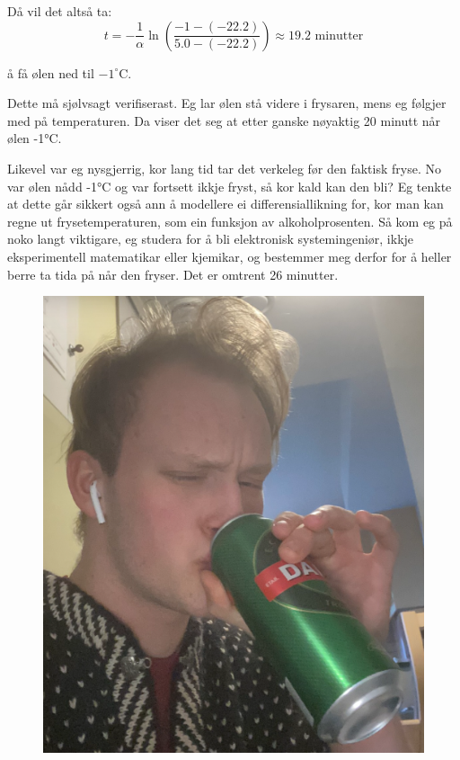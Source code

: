 \documentclass[a4paper,12pt]{article}
\begin{document}
Då vil det altså ta:
\[
t = -\frac{1}{\alpha} \ln\left(\frac{-1 - (-22.2)}{5.0 - (-22.2)}\right) \approx 19.2 \text{ minutter}
\]

å få ølen ned til $-1^\circ$C.


Dette må sjølvsagt verifiserast. Eg lar ølen stå videre i frysaren, mens eg følgjer med på temperaturen. Da viser det seg at etter ganske nøyaktig 20 minutt når ølen -1°C. 

Likevel var eg nysgjerrig, kor lang tid tar det verkeleg før den faktisk fryse. No var ølen nådd  -1°C og var fortsett ikkje fryst, så kor kald kan den bli? Eg tenkte at dette går sikkert også ann å modellere ei differensiallikning for, kor man kan regne ut frysetemperaturen, som ein funksjon av alkoholprosenten. Så kom eg på noko langt viktigare, eg studera for å bli elektronisk systemingeniør, ikkje eksperimentell matematikar eller kjemikar, og bestemmer meg derfor for å heller berre ta tida på når den fryser. Det er omtrent 26 minutter. 

\begin{figure}[h!]
    \centering
    \includegraphics[width=0.8\linewidth]{The fruit of my labour.png}
    \caption{}
    \label{ØL}
\end{figure}
\end{document}
